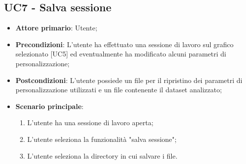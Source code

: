 \subsection{UC7 - Salva sessione}
\begin{itemize}
	\item \textbf{Attore primario}: Utente;
	\item \textbf{Precondizioni}: L'utente ha effettuato una sessione di lavoro sul grafico selezionato [UC5] ed eventualmente ha modificato alcuni parametri di personalizzazione;
	\item \textbf{Postcondizioni}: L'utente possiede un file  per il ripristino dei parametri di personalizzazione utilizzati e un file  contenente il dataset analizzato;
	\item \textbf{Scenario principale}:
		\begin{enumerate}
			\item L'utente ha una sessione di lavoro aperta;
			\item L'utente seleziona la funzionalità "salva sessione";
			\item L'utente seleziona la directory in cui salvare i file.
		\end{enumerate}
\end{itemize}